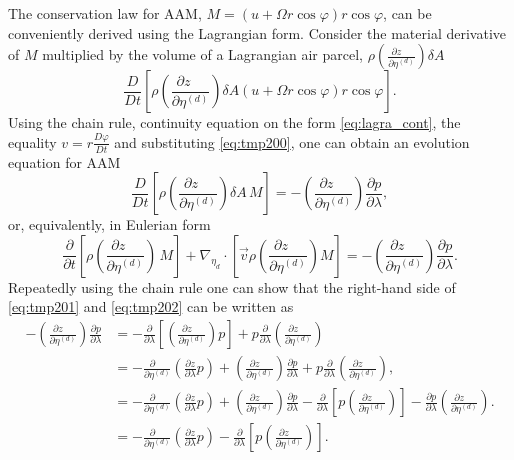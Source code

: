 \documentclass{agujournal}
\begin{document}
The conservation law for AAM, $M=\left( u+\Omega r \cos \varphi \right) r \cos \varphi$, can be conveniently derived using the Lagrangian form. Consider the material derivative of $M$ multiplied by the volume of a Lagrangian air parcel, $\rho \left( \frac{\partial z\quad }{\partial \eta^{(d)}}\right)\delta A$
\begin{equation}
\frac{D}{Dt}\left[ \rho \left( \frac{\partial z\quad }{\partial \eta^{(d)}}\right) \delta A \left( u+\Omega r \cos \varphi \right) r \cos \varphi\right].
\end{equation}
Using the chain rule, continuity equation on the form \eqref{eq:lagra_cont}, the equality $v=r\frac{D\varphi}{Dt}$ and substituting \eqref{eq:tmp200}, one can obtain an evolution equation for AAM
\begin{equation}
\frac{D}{Dt}\left[ \rho \left( \frac{\partial z\quad }{\partial \eta^{(d)}}\right) \delta A\, M \right]=- \left( \frac{\partial z\quad }{\partial \eta^{(d)}}\right) \frac{\partial p}{\partial \lambda},\label{eq:tmp201}
\end{equation}
or, equivalently, in Eulerian form
\begin{equation}
\frac{\partial}{\partial t}\left[ \rho \left( \frac{\partial z\quad }{\partial \eta^{(d)}}\right) \, M \right]+\nabla_{\eta_d}\cdot \left[\vec{v} \rho \left( \frac{\partial z\quad }{\partial \eta^{(d)}}\right)  M \right]=- \left( \frac{\partial z\quad }{\partial \eta^{(d)}}\right) \frac{\partial p}{\partial \lambda}.\label{eq:tmp202}
\end{equation}
Repeatedly using the chain rule one can show that the right-hand side of \eqref{eq:tmp201} and \eqref{eq:tmp202} can be written as
\begin{align}
- \left( \frac{\partial z\quad }{\partial \eta^{(d)}}\right)\frac{\partial p}{\partial \lambda}&=-\frac{\partial }{\partial \lambda}\left[  \left( \frac{\partial z\quad }{\partial \eta^{(d)}}\right) p\right]+p\frac{\partial }{\partial \lambda} \left( \frac{\partial z\quad }{\partial \eta^{(d)}}\right)\\ 
&=-\frac{\partial \quad}{\partial \eta^{(d)}}\left( \frac{\partial z}{\partial \lambda}p\right)+\left( \frac{\partial z\quad }{\partial \eta^{(d)}}\right)\frac{\partial p}{\partial \lambda}+p\frac{\partial }{\partial \lambda}\left( \frac{\partial z\quad }{\partial \eta^{(d)}}\right),\\
&=-\frac{\partial \quad}{\partial \eta^{(d)}}\left( \frac{\partial z}{\partial \lambda}p\right)+\left( \frac{\partial z\quad }{\partial \eta^{(d)}}\right)\frac{\partial p}{\partial \lambda}-\frac{\partial }{\partial \lambda}\left[ p\left( \frac{\partial z\quad }{\partial \eta^{(d)}}\right)\right]-\frac{\partial p}{\partial \lambda}\left( \frac{\partial z\quad }{\partial \eta^{(d)}}\right).\\
&=-\frac{\partial \quad}{\partial \eta^{(d)}}\left( \frac{\partial z}{\partial \lambda}p\right)-\frac{\partial }{\partial \lambda}\left[ p\left( \frac{\partial z\quad }{\partial \eta^{(d)}}\right)\right].\label{eq:tmp203}
\end{align}
\end{document}
